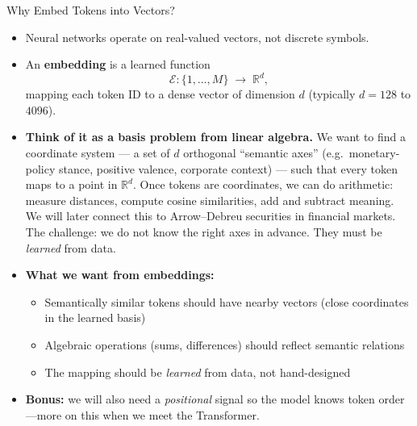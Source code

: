 \begin{frame}{Why Embed Tokens into Vectors?}
\begin{itemize}
\item Neural networks operate on real-valued vectors, not discrete symbols.

\medskip
\item An \textbf{embedding} is a learned function
\[
   \mathcal{E}\colon \{1, \ldots, M\} \;\longrightarrow\; \mathbb{R}^{d},
\]
mapping each token ID to a dense vector of dimension $d$ (typically $d=128$ to $4096$).

\medskip
\item \textbf{Think of it as a basis problem from linear algebra.} We want to find a coordinate system --- a set of $d$ orthogonal ``semantic axes'' (e.g.\ monetary-policy stance, positive valence, corporate context) --- such that every token maps to a point in $\mathbb{R}^{d}$. Once tokens are coordinates, we can do arithmetic: measure distances, compute cosine similarities, add and subtract meaning. We will later connect this to Arrow--Debreu securities in financial markets. The challenge: we do not know the right axes in advance. They must be \emph{learned} from data.

\medskip
\item \textbf{What we want from embeddings:}
\begin{itemize}
    \item Semantically similar tokens should have nearby vectors (close coordinates in the learned basis)
    \item Algebraic operations (sums, differences) should reflect semantic relations
    \item The mapping should be \emph{learned} from data, not hand-designed
\end{itemize}

\medskip
\item \textbf{Bonus:} we will also need a \emph{positional} signal so the model knows token order---more on this when we meet the Transformer.
\end{itemize}
\end{frame}

